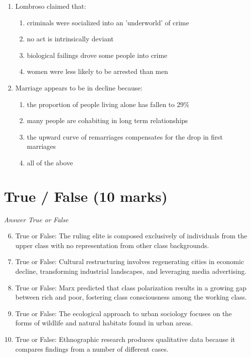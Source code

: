 \documentclass[12pt]{article}
\begin{document}
\begin{enumerate}[label=\arabic*.]
\item Lombroso claimed that:
\begin{enumerate}[label=(\alph*)]
    \item criminals were socialized into an 'underworld' of crime
    \item no act is intrinsically deviant
    \item biological failings drove some people into crime
    \item women were less likely to be arrested than men
\end{enumerate}
\item Marriage appears to be in decline because:
\begin{enumerate}[label=(\alph*)]
    \item the proportion of people living alone has fallen to 29\%
    \item many people are cohabiting in long term relationships
    \item the upward curve of remarriages compensates for the drop in first marriages
    \item all of the above
\end{enumerate}
\end{enumerate}

\section*{True / False (10 marks)}
\textit{Answer True or False}
\begin{enumerate}[label=\arabic*.]
\setcounter{enumi}{5}
\item True or False: The ruling elite is composed exclusively of individuals from the upper class with no representation from other class backgrounds.
\item True or False: Cultural restructuring involves regenerating cities in economic decline, transforming industrial landscapes, and leveraging media advertising.
\item True or False: Marx predicted that class polarization results in a growing gap between rich and poor, fostering class consciousness among the working class.
\item True or False: The ecological approach to urban sociology focuses on the forms of wildlife and natural habitats found in urban areas.
\item True or False: Ethnographic research produces qualitative data because it compares findings from a number of different cases.
\end{enumerate}
\end{document}
